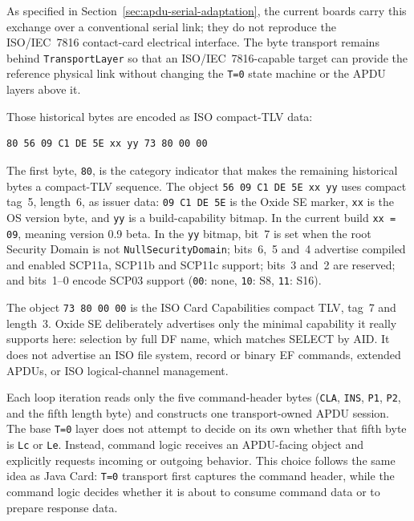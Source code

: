As specified in Section~\ref{sec:apdu-serial-adaptation}, the current boards carry
this exchange over a conventional serial link; they do not reproduce the
ISO/IEC~7816 contact-card electrical interface. The byte transport remains
behind \texttt{TransportLayer} so that an ISO/IEC~7816-capable target can
provide the reference physical link without changing the \texttt{T=0} state
machine or the APDU layers above it.

Those historical bytes are encoded as ISO compact-TLV data:
\begin{verbatim}
80 56 09 C1 DE 5E xx yy 73 80 00 00
\end{verbatim}
The first byte, \texttt{80}, is the category indicator that makes the
remaining historical bytes a compact-TLV sequence. The object
\texttt{56 09 C1 DE 5E xx yy} uses compact tag~5, length~6, as issuer data:
\texttt{09 C1 DE 5E} is the Oxide SE marker, \texttt{xx} is the
OS version byte, and \texttt{yy} is a build-capability bitmap.
In the current build \texttt{xx = 09}, meaning version 0.9 beta. In the
\texttt{yy} bitmap, bit~7
is set when the root Security Domain is
not \texttt{NullSecurityDomain}; bits~6,~5 and~4 advertise compiled and
enabled SCP11a, SCP11b and SCP11c support; bits~3 and~2 are reserved;
and bits~1--0 encode SCP03 support (\texttt{00}: none, \texttt{10}:
S8, \texttt{11}: S16).

The object \texttt{73 80 00 00} is the ISO Card Capabilities compact
TLV, tag~7 and length~3. Oxide SE deliberately advertises only the
minimal capability it really supports here: selection by full DF name,
which matches SELECT by AID. It does not advertise an ISO file system,
record or binary EF commands, extended APDUs, or ISO logical-channel
management.

Each loop iteration reads only the five command-header bytes
(\texttt{CLA}, \texttt{INS}, \texttt{P1}, \texttt{P2}, and the fifth
length byte) and constructs one transport-owned APDU session. The base
\texttt{T=0} layer does not attempt to decide on its own whether that
fifth byte is
\texttt{Lc} or \texttt{Le}. Instead, command logic receives an
APDU-facing object and explicitly requests incoming or outgoing
behavior. This choice follows the same idea as Java Card:
\texttt{T=0} transport first captures the command header, while the
command logic decides whether it is about to consume command data or to
prepare response data.

